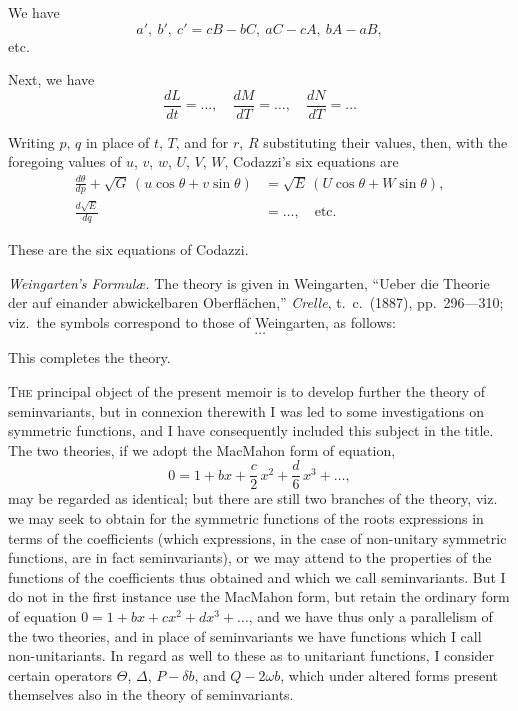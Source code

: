 \documentclass[11pt,a4paper]{book}
\begin{document}
{{{We have
\[
a',\ b',\ c' = cB - bC,\ aC - cA,\ bA - aB,
\]
etc.

Next, we have
\[
\frac{dL}{dt} = \ldots, \quad \frac{dM}{dT} = \ldots, \quad \frac{dN}{dT} = \ldots
\]

Writing $p$, $q$ in place of $t$, $T$, and for $r$, $R$ substituting their values, then, with
the foregoing values of $u$, $v$, $w$, $U$, $V$, $W$, Codazzi's six equations are
\begin{align*}
\frac{d\theta}{dp} + \sqrt{G}\,(u\cos\theta + v\sin\theta) &= \sqrt{E}\,(U\cos\theta + W\sin\theta),\\
\frac{d\sqrt{E}}{dq} &= \ldots, \quad \text{etc.}
\end{align*}

These are the six equations of Codazzi.

\textit{Weingarten's Formul\ae.} The theory is given in Weingarten,
``Ueber die Theorie der auf einander abwickelbaren Oberfl\"achen,''
\textit{Crelle}, t.\ c.\ (1887), pp.\ 296---310; viz.\ the symbols correspond to those of
Weingarten, as follows:
\[
\ldots
\]

This completes the theory.

\newpage

\begin{flushright}
\end{flushright}

\textsc{The} principal object of the present memoir is to develop further the theory of
seminvariants, but in connexion therewith I was led to some investigations on
symmetric functions, and I have consequently included this subject in the title. The
two theories, if we adopt the MacMahon form of equation,
\[
0 = 1 + bx + \frac{c}{2}\,x^2 + \frac{d}{6}\,x^3 + \ldots,
\]
may be regarded as identical; but there are still two branches of the theory, viz.
we may seek to obtain for the symmetric functions of the roots expressions in terms
of the coefficients (which expressions, in the case of non-unitary symmetric functions,
are in fact seminvariants), or we may attend to the properties of the functions of
the coefficients thus obtained and which we call seminvariants. But I do not in
the first instance use the MacMahon form, but retain the ordinary form of equation
$0 = 1 + bx + cx^2 + dx^3 + \ldots$, and we have thus only a parallelism of the two theories,
and in place of seminvariants we have functions which I call non-unitariants. In
regard as well to these as to unitariant functions, I consider certain operators
$\Theta$, $\Delta$, $P - \delta b$, and $Q - 2\omega b$, which under altered forms present themselves also in
the theory of seminvariants.

}}}
\end{document}
